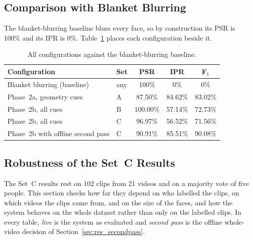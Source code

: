 \subsection{Comparison with Blanket Blurring}
\label{sec:res_baseline}

The blanket-blurring baseline blurs every face, so by construction its PSR is 100\% and its
IPR is 0\%. Table~\ref{tab:vs_baseline} places each configuration beside it.

\begin{table}[htbp]
\begin{singlespace}
\centering
\caption{All configurations against the blanket-blurring baseline.}
\label{tab:vs_baseline}
\renewcommand{\arraystretch}{1.3}
\begin{tabular}{@{}llccc@{}}
\toprule
\textbf{Configuration} & \textbf{Set} & \textbf{PSR} & \textbf{IPR} & \textbf{F$_1$} \\
\midrule
Blanket blurring (baseline)       & any & 100\%    & 0\%     & 0\% \\
Phase~2a, geometry cues           & A   & 87.50\%  & 84.62\% & 83.02\% \\
Phase~2b, all cues                & B   & 100.00\% & 57.14\% & 72.73\% \\
Phase~2b, all cues                & C   & 96.97\%  & 56.52\% & 71.56\% \\
Phase~2b with offline second pass & C   & 90.91\%  & 85.51\% & 90.08\% \\
\bottomrule
\end{tabular}
\end{singlespace}
\end{table}

\subsection{Robustness of the Set~C Results}
\label{sec:res_robust}

The Set~C results rest on 102 clips from 21 videos and on a majority vote of five people.
This section checks how far they depend on who labelled the clips, on which videos the
clips came from, and on the size of the faces, and how the system behaves on the whole
dataset rather than only on the labelled clips. In every table, \emph{live} is the system
as evaluated and \emph{second pass} is the offline whole-video decision of
Section~\ref{sec:res_secondpass}.

